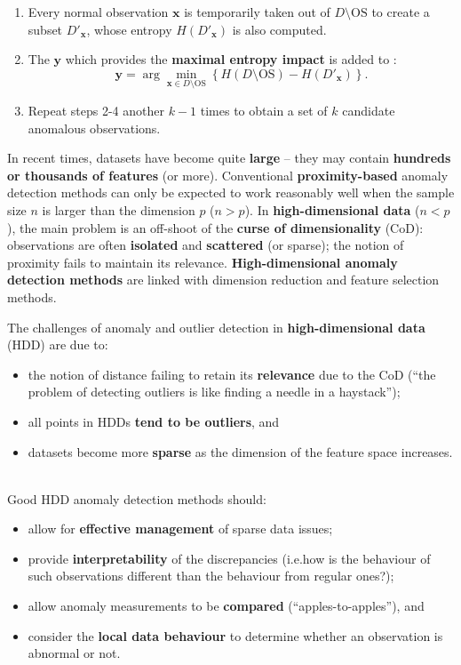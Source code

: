 \documentclass[20pt,landscape,footrule,headrule]{foils}
\newcommand{\newl}{\newline\newline}
\def\fh{\foilhead}
\begin{document}
{{\begin{enumerate}
\item Every normal observation $\mathbf{x}$ is temporarily taken out of $D\setminus \text{OS}$ to create a subset $D'_{\mathbf{x}}$, whose entropy $H(D'_{\mathbf{x}})$ is also computed.
\item The $\mathbf{y}$ which provides the \textbf{maximal entropy impact} is added to : $$\mathbf{y}=\arg\min_{\mathbf{x}\in D\setminus \text{OS}} \left\{H(D\setminus \text{OS})-H(D'_{\mathbf{x}})\right\}.$$
\item Repeat steps 2-4 another $k-1$ times to obtain a set  of $k$ candidate anomalous observations.
\end{enumerate}

\fh{\textcolor{darkestgreen}{5.4 -- Anomalies in High-Dimensional Datasets}} \label{5.4}
\noindent In recent times, datasets have become quite \textbf{large} -- they may contain \textbf{hundreds or thousands of features} (or more).
\newl Conventional \textbf{proximity-based} anomaly detection methods can only be expected to work reasonably well when the sample size $n$ is larger than the dimension $p$ ($n>p$). 
\newl
In \textbf{high-dimensional data} ($n<p$), the main problem is an off-shoot of the \textbf{curse of dimensionality} (CoD):  observations are often \textbf{isolated} and \textbf{scattered} (or sparse); the notion of proximity fails to maintain its relevance. \newl \textbf{High-dimensional anomaly detection methods} are linked with dimension reduction and feature selection methods. 

\fh{5.4.1 -- Definitions and Challenges} \label{5.4.1}
\noindent The challenges of anomaly and outlier detection in \textbf{high-dimensional data} (HDD) are due to:
\begin{itemize}
\item the notion of distance failing to retain its \textbf{relevance} due to the CoD (``the problem of detecting outliers is like finding a needle in a haystack'');
\item all points in HDDs \textbf{tend to be  outliers}, and 
\item datasets become more \textbf{sparse} as the dimension of the feature space increases.
\end{itemize}

\newpage\ \\ \noindent Good HDD anomaly detection methods should:
\begin{itemize}
\item allow for \textbf{effective management} of sparse data issues;
\item provide \textbf{interpretability} of the discrepancies (i.e.\@ how is the behaviour of such observations different than the behaviour from regular ones?);
\item allow anomaly measurements to be \textbf{compared} (``apples-to-apples''), and 
\item consider the \textbf{local data behaviour} to determine whether an observation is abnormal or not.
\end{itemize}

}}
\end{document}

